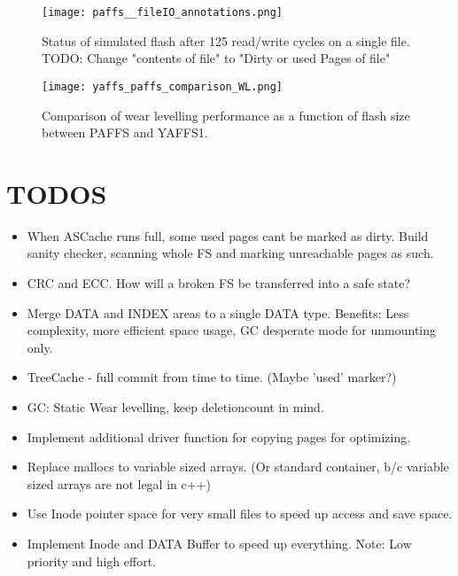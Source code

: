 \begin{figure}[htp]
	\centering\texttt{[image: paffs\_\_fileIO\_annotations.png]}
	\caption{\label{fig:fileIO} Status of simulated flash after 125 read/write cycles on a single file.\\TODO: Change "contents of file" to "Dirty or used Pages of file"}
\end{figure}
\begin{figure}[htp]
	\centering\texttt{[image: yaffs\_paffs\_comparison\_WL.png]}
	\caption{\label{fig:fileIOCompare} Comparison of wear levelling performance as a function of flash size between PAFFS and YAFFS1.}
\end{figure}


\appendix
\section{TODOS}
\begin{itemize}
	\item When ASCache runs full, some used pages cant be marked as dirty. Build sanity checker, scanning whole FS and marking unreachable pages as such.
	\item CRC and ECC. How will a broken FS be transferred into a safe state?
	\item Merge DATA and INDEX areas to a single DATA type. Benefits: Less complexity, more efficient space usage, GC desperate mode for unmounting only.
	\item TreeCache - full commit from time to time. (Maybe 'used' marker?)
	\item GC: Static Wear levelling, keep deletioncount in mind.
	\item Implement additional driver function for copying pages for optimizing.
	\item Replace mallocs to variable sized arrays. (Or standard container, b/c variable sized arrays are not legal in c++)
	\item Use Inode pointer space for very small files to speed up access and save space.
	\item Implement Inode and DATA Buffer to speed up everything. Note: Low priority and high effort.
\end{itemize}